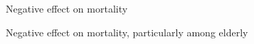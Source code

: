 \documentclass[notes,11pt, aspectratio=169]{beamer}
\begin{document}
\begin{frame}{Negative effect on mortality}
\end{frame}
\begin{frame}{Negative effect on mortality, particularly among elderly}
\end{frame}
\end{document}
